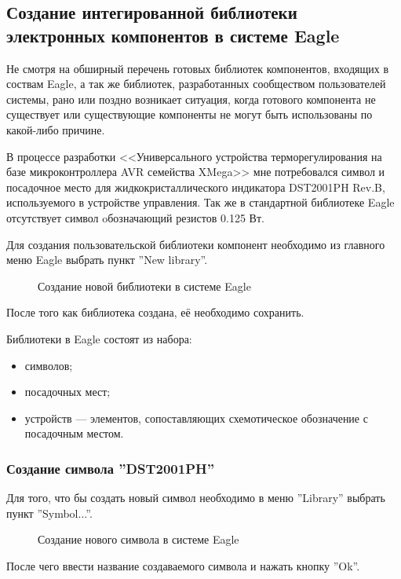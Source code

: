 \subsection{Создание интегированной библиотеки электронных компонентов в системе Eagle} 
Не смотря на обширный перечень готовых библиотек компонентов, входящих в соствам Eagle, а
так же библиотек, разработанных сообществом пользователей системы, рано или поздно возникает
ситуация, когда готового компонента не существует или существующие компоненты не могут
быть использованы по какой-либо причине.


В процессе разработки <<Универсального устройства терморегулирования на базе микроконтроллера
AVR семейства XMega>> мне потребовался символ и посадочное место для
жидкокристаллического индикатора DST2001PH Rev.B, используемого в устройстве управления.
Так же в стандартной библиотеке Eagle отсутствует символ oбозначающий резистов 0.125 Вт.

Для создания пользовательской библиотеки компонент необходимо из главного меню Eagle
выбрать пункт ''New library''.
\begin{figure}[h]
	\caption{Создание новой библиотеки в системе Eagle}
	\label{img:newLibrary}
\end{figure}
После того как библиотека создана, её необходимо сохранить.


Библиотеки в Eagle состоят из набора:
\begin{itemize}
	\item{} символов;
	\item{} посадочных мест;
	\item{} устройств --- элементов, сопоставляющих схемотическое обозначение
		с посадочным местом.
\end{itemize}

\subsubsection{Создание символа ''DST2001PH''}

Для того, что бы создать новый символ необходимо в меню ''Library'' выбрать пункт ''Symbol...''.
\begin{figure}[h]
	\caption{Создание нового символа в системе Eagle}
	\label{img:newSymbol}
\end{figure}
После чего ввести название создаваемого символа и нажать кнопку ''Ok''.

